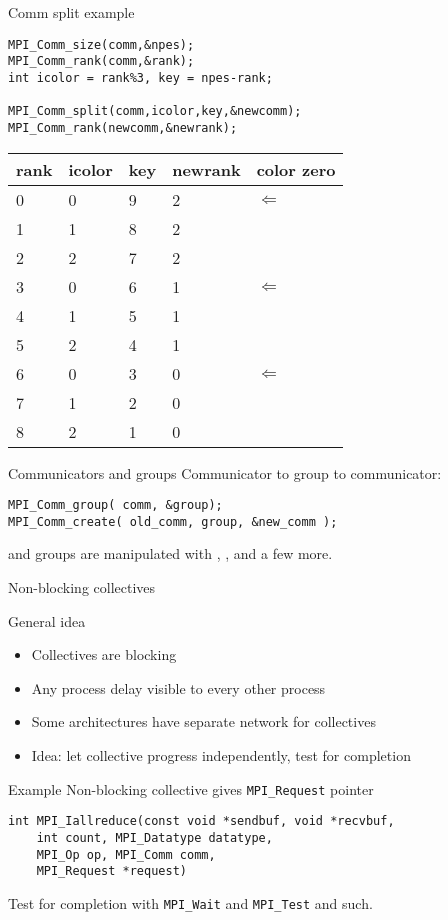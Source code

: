 \begin{frame}[fragile]{Comm split example}
\small
\begin{verbatim}
MPI_Comm_size(comm,&npes);
MPI_Comm_rank(comm,&rank);
int icolor = rank%3, key = npes-rank;

MPI_Comm_split(comm,icolor,key,&newcomm);
MPI_Comm_rank(newcomm,&newrank);
\end{verbatim}

\begin{tabular}{|lllll|}
\midrule
rank&icolor&key&newrank&color zero\\ \midrule
0&0&9&2&$\Leftarrow$\\
1&1&8&2&\\
2&2&7&2&\\
3&0&6&1&$\Leftarrow$\\
4&1&5&1&\\
5&2&4&1&\\
6&0&3&0&$\Leftarrow$\\
7&1&2&0&\\
8&2&1&0&\\
\midrule
\end{tabular}
\end{frame}

\begin{frame}[fragile]{Communicators and groups}
Communicator to group to communicator:
\begin{verbatim}
MPI_Comm_group( comm, &group);
MPI_Comm_create( old_comm, group, &new_comm );
\end{verbatim}
and groups are manipulated with
, ,
 and a few more.
\end{frame}

 {Non-blocking collectives}
 
\begin{frame}{General idea}
\begin{itemize}
\item Collectives are blocking
\item Any process delay visible to every other process
\item Some architectures have separate network for collectives
\item Idea: let collective progress independently, test for completion
\end{itemize}
\end{frame}

\begin{frame}[fragile]{Example}
Non-blocking collective gives \verb+MPI_Request+ pointer
\begin{verbatim}
int MPI_Iallreduce(const void *sendbuf, void *recvbuf, 
    int count, MPI_Datatype datatype, 
    MPI_Op op, MPI_Comm comm, 
    MPI_Request *request)
\end{verbatim}
Test for completion with \verb+MPI_Wait+ and \verb+MPI_Test+ and such.
\end{frame}

